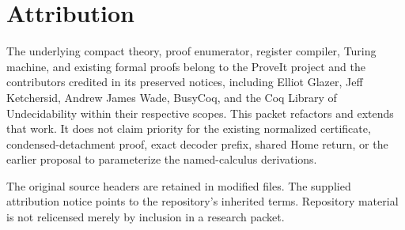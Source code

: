 \documentclass[11pt,letterpaper]{article}
\theoremstyle{definition}\newtheorem{definition}[theorem]{Definition}
\begin{document}
\section{Attribution}

The underlying compact theory, proof enumerator, register compiler, Turing
machine, and existing formal proofs belong to the ProveIt project and the
contributors credited in its preserved notices, including Elliot Glazer,
Jeff Ketchersid, Andrew James Wade, BusyCoq, and the Coq Library of
Undecidability within their respective scopes. This packet refactors and extends
that work. It does not claim priority for the existing normalized certificate,
condensed-detachment proof, exact decoder prefix, shared Home return, or the
earlier proposal to parameterize the named-calculus derivations.

The original source headers are retained in modified files. The supplied
attribution notice points to the repository's inherited terms. Repository
material is not relicensed merely by inclusion in a research packet.
\end{document}

